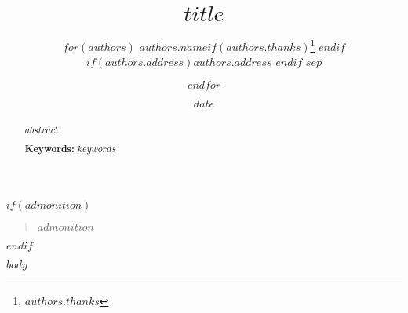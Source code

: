 \documentclass[11pt]{article}
\begin{document}

\title{$title$}
\author{  
  $for(authors)$
  $authors.name$$if(authors.thanks)$\thanks{$authors.thanks$} $endif$ \\
  $if(authors.address)$$authors.address$ $endif$ 
  $sep$ \and $endfor$
}
\date{$date$}

\maketitle

$if(admonition)$
\begin{quotation}
$admonition$
\end{quotation}
$endif$

\begin{abstract}
  $abstract$ 
  
  \vspace{11pt}
  \noindent\textbf{Keywords:} $keywords$
\end{abstract}


$body$





\end{document}

